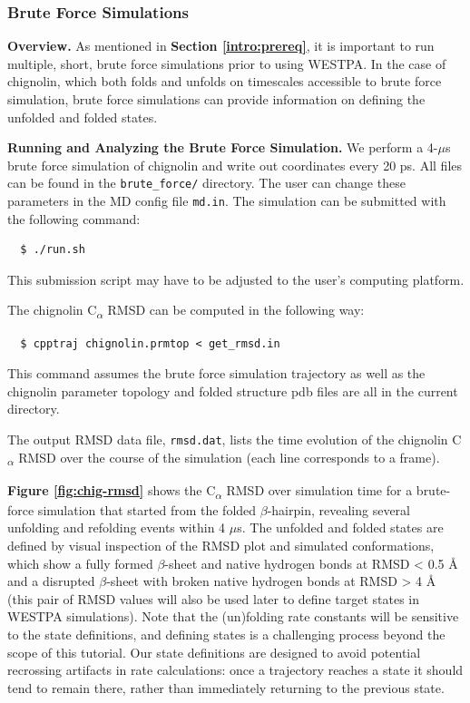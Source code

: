 \subsubsection{Brute Force Simulations}

\textbf{Overview.} As mentioned in \textbf{Section \ref{intro:prereq}}, it is important to run multiple, short, brute force simulations prior to using WESTPA. 
In the case of chignolin, which both folds and unfolds on timescales accessible to brute force simulation, brute force simulations can provide information on defining the unfolded and folded states. 
 
\textbf{Running and Analyzing the Brute Force Simulation.} We perform a 4-$\mu$s brute force simulation of chignolin and write out coordinates every 20 ps. 
All files can be found in the \verb|brute_force/| directory. 
The user can change these parameters in the MD config file \verb|md.in|. 
The simulation can be submitted with the following command:

\begin{verbatim}
  $ ./run.sh
\end{verbatim}
 
This submission script may have to be adjusted to the user’s computing platform.

The chignolin C\textsubscript{$\alpha$} RMSD can be computed in the following way:

\begin{verbatim}
  $ cpptraj chignolin.prmtop < get_rmsd.in
\end{verbatim}

This command assumes the brute force simulation trajectory as well as the chignolin parameter topology and folded structure pdb files are all in the current directory.

The output RMSD data file, \verb|rmsd.dat|, lists the time evolution of the chignolin C\textsubscript{$\alpha$} RMSD over the course of the simulation (each line corresponds to a frame). 

\textbf{Figure \ref{fig:chig-rmsd}} shows the C\textsubscript{$\alpha$} RMSD over simulation time for a brute-force simulation that started from the folded $\beta$-hairpin, revealing several unfolding and refolding events within 4 $\mu$s. 
The unfolded and folded states are defined by visual inspection of the RMSD plot and simulated conformations, which show a fully formed $\beta$-sheet and native hydrogen bonds at RMSD < 0.5 \AA{} and a disrupted $\beta$-sheet with broken native hydrogen bonds at RMSD > 4 \AA{} (this pair of RMSD values will also be used later to define target states in WESTPA simulations).  
Note that the (un)folding rate constants will be sensitive to the state definitions, and defining states is a challenging process beyond the scope of this tutorial. 
Our state definitions are designed to avoid potential recrossing artifacts in rate calculations: once a trajectory reaches a state it should tend to remain there, rather than immediately returning to the previous state.
 

